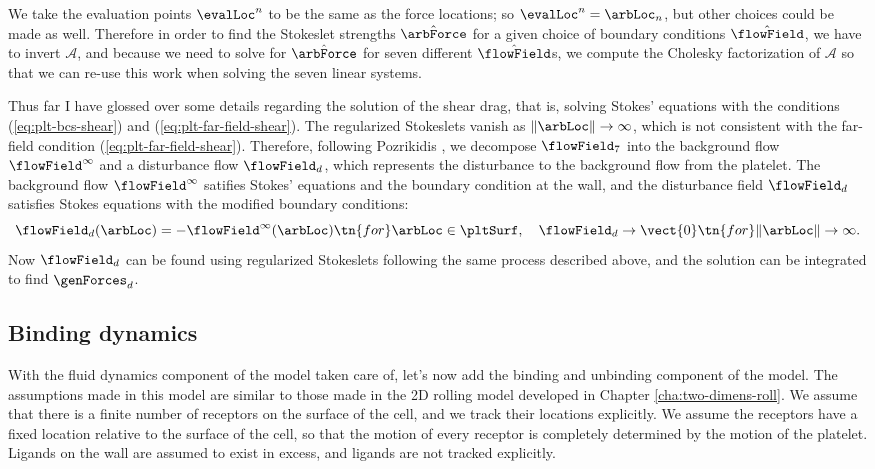 We take the evaluation points $\evalLoc^n$ to be the same as the force
locations; so $\evalLoc^n = \arbLoc_n$, but other choices could be
made as well. Therefore in order to find the Stokeslet strengths
$\hat{\arbForce}$ for a given choice of boundary conditions
$\hat{\flowField}$, we have to invert $\mathcal{A}$, and because we
need to solve for $\hat{\arbForce}$ for seven different
$\hat{\flowField}$s, we compute the Cholesky factorization of
$\mathcal{A}$ so that we can re-use this work when solving the seven
linear systems.

Thus far I have glossed over some details regarding the solution of
the shear drag, that is, solving Stokes' equations with the conditions
(\ref{eq:plt-bcs-shear}) and (\ref{eq:plt-far-field-shear}). The
regularized Stokeslets vanish as $\|\arbLoc\| \rightarrow \infty$,
which is not consistent with the far-field condition
(\ref{eq:plt-far-field-shear}). Therefore, following Pozrikidis
\cite{Pozrikidis92}, we decompose $\flowField_7$ into the background
flow $\flowField^\infty$ and a disturbance flow $\flowField_d$, which
represents the disturbance to the background flow from the
platelet. The background flow $\flowField^\infty$ satifies Stokes'
equations and the boundary condition at the wall, and the disturbance
field $\flowField_d$ satisfies Stokes equations with the modified
boundary conditions:
\begin{equation}
  \label{eq:disturbance-bcs}
  \flowField_d(\arbLoc) = -\flowField^\infty(\arbLoc) \tn{ for }
  \arbLoc \in \pltSurf, \quad \flowField_d \rightarrow \vect{0} \tn{
    for } \|\arbLoc\| \rightarrow \infty.
\end{equation}
Now $\flowField_d$ can be found using regularized Stokeslets following
the same process described above, and the solution can be integrated
to find $\genForces_d$.

\subsection{Binding dynamics}
\label{sec:binding-dynamics}

With the fluid dynamics component of the model taken care of, let's
now add the binding and unbinding component of the model. The
assumptions made in this model are similar to those made in the 2D
rolling model developed in Chapter \ref{cha:two-dimens-roll}. We
assume that there is a finite number of receptors on the surface of
the cell, and we track their locations explicitly. We assume the
receptors have a fixed location relative to the surface of the cell,
so that the motion of every receptor is completely determined by the
motion of the platelet. Ligands on the wall are assumed to exist in
excess, and ligands are not tracked explicitly.

